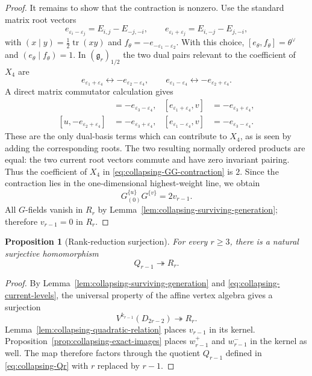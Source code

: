 \documentclass[11pt,reqno]{amsart}
\newtheorem{proposition}[theorem]{Proposition}
\theoremstyle{definition}
\theoremstyle{remark}
\begin{document}
\begin{proof}
It remains to show that the contraction is nonzero.  Use the standard
matrix root vectors
\begin{equation*}
 e_{\varepsilon_i-\varepsilon_j}=E_{i,j}-E_{-j,-i},
 \qquad
 e_{\varepsilon_i+\varepsilon_j}=E_{i,-j}-E_{j,-i},
\end{equation*}
with $(x\mid y)=\frac12\operatorname{tr}(xy)$ and
$f_\theta=-e_{-\varepsilon_1-\varepsilon_2}$.  With this choice,
$[e_\theta,f_\theta]=\theta^\vee$ and
$(e_\theta\mid f_\theta)=1$.  In
$(\mathfrak g_r)_{1/2}$ the two dual pairs relevant to the coefficient of
$X_4$ are
\begin{equation*}
 e_{\varepsilon_1+\varepsilon_4}
 \longleftrightarrow -e_{\varepsilon_2-\varepsilon_4},
 \qquad
 e_{\varepsilon_1-\varepsilon_4}
 \longleftrightarrow -e_{\varepsilon_2+\varepsilon_4}.
\end{equation*}
A direct matrix commutator calculation gives
\begin{align*}
 [u,-e_{\varepsilon_2-\varepsilon_4}]
 &=-e_{\varepsilon_3-\varepsilon_4},
 &
 [e_{\varepsilon_1+\varepsilon_4},v]
 &=-e_{\varepsilon_3+\varepsilon_4},\\
 [u,-e_{\varepsilon_2+\varepsilon_4}]
 &=-e_{\varepsilon_3+\varepsilon_4},
 &
 [e_{\varepsilon_1-\varepsilon_4},v]
 &=-e_{\varepsilon_3-\varepsilon_4}.
\end{align*}
These are the only dual-basis terms which can contribute to $X_4$, as is
seen by adding the corresponding roots.  The two resulting normally
ordered products are equal: the two current root vectors commute and have
zero invariant pairing.  Thus the coefficient of $X_4$ in
\eqref{eq:collapsing-GG-contraction} is $2$.  Since the contraction lies in
the one-dimensional highest-weight line, we obtain
\begin{equation*}
 G^{\{u\}}_{(0)}G^{\{v\}}=2v_{r-1}.
\end{equation*}
All $G$-fields vanish in $R_r$ by
Lemma~\ref{lem:collapsing-surviving-generation}; therefore
$v_{r-1}=0$ in $R_r$.
\end{proof}

\begin{proposition}[Rank-reduction surjection]
\label{prop:collapsing-rank-surjection}
For every $r\ge3$, there is a natural surjective homomorphism
\begin{equation*}
  Q_{r-1}\twoheadrightarrow R_r.
\end{equation*}
\end{proposition}

\begin{proof}
By Lemma~\ref{lem:collapsing-surviving-generation} and
\eqref{eq:collapsing-current-levels}, the universal property of the affine
vertex algebra gives a surjection
\begin{equation*}
  V^{k_{r-1}}(D_{2r-2})\twoheadrightarrow R_r.
\end{equation*}
Lemma~\ref{lem:collapsing-quadratic-relation} places $v_{r-1}$ in its
kernel.  Proposition~\ref{prop:collapsing-exact-images} places
$w_{r-1}^+$ and $w_{r-1}^-$ in the kernel as well.  The map therefore
factors through the quotient $Q_{r-1}$ defined in
\eqref{eq:collapsing-Qr} with $r$ replaced by $r-1$.
\end{proof}
\end{document}
